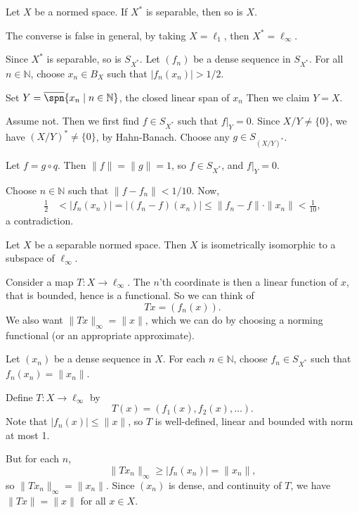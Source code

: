 \documentclass[12pt]{article}
\begin{document}
\begin{theorem}
	Let $X$ be a normed space. If $X^\ast$ is separable, then so is $X$.
\end{theorem}

\begin{remark}
	The converse is false in general, by taking $X = \ell_1$, then $X^\ast = \ell_\infty$.
\end{remark}

\begin{proofbox}
	Since $X^\ast$ is separable, so is $S_{X^\ast}$. Let $(f_n)$ be a dense sequence in $S_{X^\ast}$. For all $n \in \mathbb{N}$, choose $x_n \in B_X$ such that $|f_n(x_n)| > 1/2$.

	Set $Y = \overline{\spn}\{x_n \mid n \in \mathbb{N}\}$, the closed linear span of $x_n$ Then we claim $Y = X$.

	Assume not. Then we first find $f \in S_{X^\ast}$ such that $f|_Y = 0$. Since $X/Y \neq \{0\}$, we have $(X/Y)^\ast \neq \{0\}$, by Hahn-Banach. Choose any $g \in S_{(X/Y)^\ast}$.

	Let $f = g \circ q$. Then $\|f\| = \|g\| = 1$, so $f \in S_{X^\ast}$, and $f|_Y = 0$.

	Choose $n \in \mathbb{N}$ such that $\|f - f_n\| < 1/10$. Now,
	\begin{align*}
		\frac{1}{2} &< |f_n(x_n)| = |(f_n - f)(x_n)| \leq \|f_n - f\| \cdot \|x_n\| < \frac{1}{10},
	\end{align*}
	a contradiction.
\end{proofbox}

\begin{theorem}
	Let $X$ be a separable normed space. Then $X$ is isometrically isomorphic to a subspace of $\ell_\infty$.
\end{theorem}

Consider a map $T : X \to \ell_\infty$. The $n$'th coordinate is then a linear function of $x$, that is bounded, hence is a functional. So we can think of
\[
Tx = (f_n(x)).
\]
We also want $\|Tx\|_\infty = \|x\|$, which we can do by choosing a norming functional (or an appropriate approximate).

\begin{proofbox}
	Let $(x_n)$ be a dense sequence in $X$. For each $n \in \mathbb{N}$, choose $f_n \in S_{X^\ast}$ such that $f_n(x_n) = \|x_n\|$.

	Define $T : X \to \ell_\infty$ by
	\[
		T(x) = (f_1(x), f_2(x), \ldots).
	\]
	Note that $|f_n(x)| \leq \|x\|$, so $T$ is well-defined, linear and bounded with norm at most 1.

	But for each $n$,
	\[
	\|Tx_n\|_{\infty} \geq |f_n(x_n)| = \|x_n\|,
	\]
	so $\|Tx_n\|_{\infty} = \|x_n\|$. Since $(x_n)$ is dense, and continuity of $T$, we have $\|Tx\| = \|x\|$ for all $x \in X$.
\end{proofbox}
\end{document}
